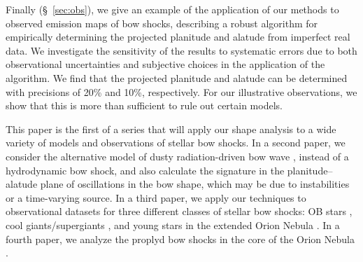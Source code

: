 \documentclass[useAMS, usenatbib, a4paper]{mnras}
\begin{document}
Finally (\S~\ref{sec:obs}), we give an example of the application of
our methods to observed emission maps of bow shocks, describing a
robust algorithm for empirically determining the projected planitude
and alatude from imperfect real data.  We investigate the sensitivity
of the results to systematic errors due to both observational
uncertainties and subjective choices in the application of the
algorithm.  We find that the projected planitude and alatude can be
determined with precisions of 20\% and 10\%, respectively.  For our
illustrative observations, we show that this is more than sufficient
to rule out certain models.

This paper is the first of a series that will apply our shape analysis
to a wide variety of models and observations of stellar bow shocks.
In a second paper, %
we consider the alternative model of dusty radiation-driven bow wave
\citep{Ochsendorf:2014a}, instead of a hydrodynamic bow shock, and
also calculate the signature in the planitude--alatude plane of
oscillations in the bow shape, which may be due to instabilities or a
time-varying source.  In a third paper, %
we apply our techniques to observational datasets for three different
classes of stellar bow shocks: OB stars \citep{Kobulnicky:2016a}, cool
giants/supergiants \citep{Cox:2012a}, and young stars in the extended
Orion Nebula \citep{Henney:2013a}.  In a fourth paper,
we analyze the proplyd bow shocks in the core of the Orion Nebula
\citep{Garcia-Arredondo:2001a}.



 
\end{document}
